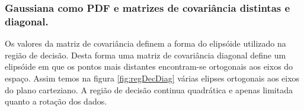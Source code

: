 \documentclass[ 
	article,			%
	11pt,				%
	oneside,			%
	a4paper,			%
	english,			%
	brazil,				%
	]{abntex2}
\begin{document}
\subsubsection{ Gaussiana como PDF e matrizes de covariância distintas e diagonal.}
Os valores da matriz de covariância definem a forma do elipsóide utilizado na
região de decisão. Desta forma uma matriz de covariância diagonal define um
elipsóide em que os pontos mais distantes encontram-se ortogonais aos eixos do
espaço. Assim temos na figura \ref{fig:regDecDiag} várias elipses ortogonais aos
eixos do plano carteziano. A região de decisão continua quadrática e apenas
limitada quanto a rotação dos dados.
% 
% 
% 
\end{document}
